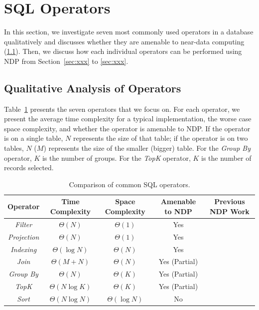 \documentclass{article}
\newcommand{\filter}{\textit{Filter}\xspace}
\newcommand{\projection}{\textit{Projection}\xspace}
\newcommand{\join}{\textit{Join}\xspace}
\newcommand{\sort}{\textit{Sort}\xspace}
\newcommand{\indexing}{\textit{Indexing}\xspace}
\newcommand{\groupby}{\textit{Group By}\xspace}
\newcommand{\topk}{\textit{TopK}\xspace}
\begin{document}
\section{SQL Operators}

In this section, we investigate seven most commonly used operators in a database qualitatively and discusses whether they are amenable to near-data computing (\cref{sec:analysis}). Then, we discuss how each individual operators can be performed using NDP from Section~\ref{sec:xxx} to \ref{sec:xxx}.

\subsection{Qualitative Analysis of Operators} \label{sec:analysis}

Table~\ref{tab:operators} presents the seven operators that we focus on. For each operator, we present the average time complexity for a typical implementation, the worse case space complexity, and whether the operator is amenable to NDP.
If the operator is on a single table, $N$ represents the size of that table; if the operator is on two tables, $N$ ($M$) represents the size of the smaller (bigger) table. 
For the \textit{Group By} operator, $K$ is the number of groups. For the \textit{TopK} operator, $K$ is the number of records selected. 

\begin{table}
\centering 
\begin{tabular}{ |c|c|c|c|c| } 
 \hline
 Operator       & Time Complexity & Space Complexity  & Amenable to NDP & Previous NDP Work \\ \hline
 \filter        & $\Theta(N)$     & $\Theta(1)$       & Yes             & \cite{netezza,exadata,biscuit,sukhwani2012database,do2013query} \\ \hline
 \projection    & $\Theta(N)$     & $\Theta(1)$       & Yes             & \cite{netezza, exadata} \\\hline
 \indexing      & $\Theta(\log{N})$ & $\Theta(N)$     & Yes             & \\ \hline
 \join          & $\Theta(M + N)$ & $\Theta(N)$       & Yes (Partial)   & \cite{exadata} \\ \hline
 \groupby       & $\Theta(N)$     & $\Theta(K)$       & Yes (Partial)   & \cite{ibex, jafar} \\ \hline
 \topk          & $\Theta(N\log{K})$ & $\Theta(K)$    & Yes (Partial)   & \\ \hline
 \sort          & $\Theta(N\log{N})$ & $\Theta(\log{N})$ & No           & \\ \hline
\end{tabular}
\caption{Comparison of common SQL operators.}
\label{tab:operators}
\end{table}
\end{document}
